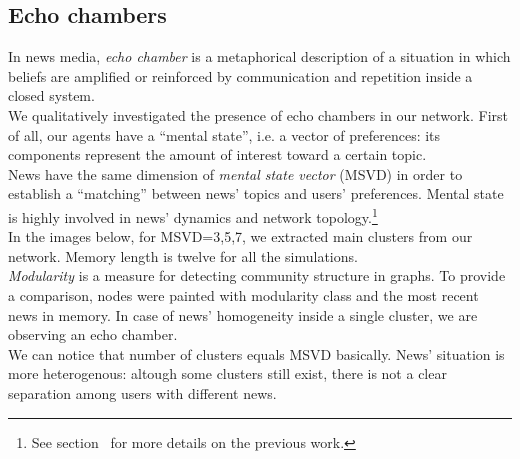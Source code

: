 \subsection{Echo chambers}
In news media, \textit{echo chamber} is a metaphorical description
of a situation in which beliefs are amplified or reinforced by
communication and repetition inside a closed system.\cite{echochamwiki,echocham}\\
We qualitatively investigated the presence of echo chambers in our network.
First of all, our agents have a ``mental  state'', i.e. a vector of preferences: its components represent the amount of interest toward a certain topic.\\
 News have the same dimension of \textit{mental state vector} (MSVD) in order to establish a ``matching'' between news' topics and users' preferences.
 Mental state is highly involved in news' dynamics and network topology.\footnote{See section~ for more details on the previous work.}\\
 In the images below, for MSVD=3,5,7, we extracted main clusters from our network.
 Memory length is twelve for all the simulations.\\
 \textit{Modularity} is a measure for detecting community structure in graphs.\cite{modulwiki}
 To provide a comparison, nodes were painted with modularity class and the most recent news in memory.
 In case of news' homogeneity inside a single cluster, we are observing an echo chamber.\\
We can notice that number of clusters equals MSVD basically.
News' situation is more heterogenous: altough some clusters still exist, there is not a clear separation among users with different news.


